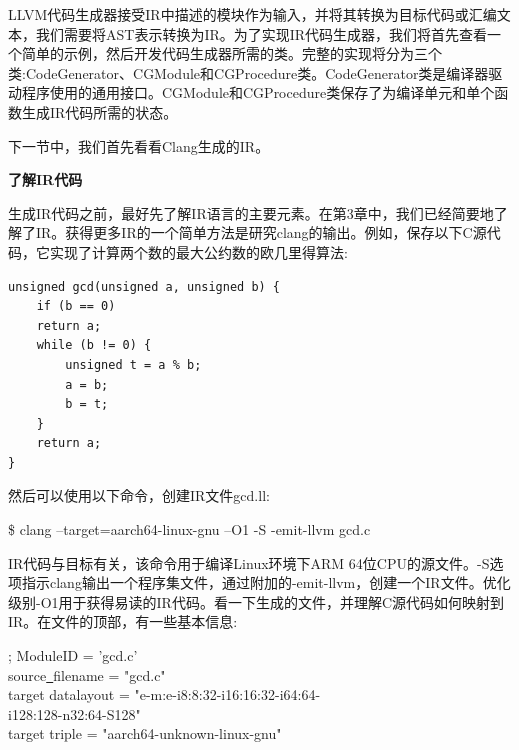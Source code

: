 LLVM代码生成器接受IR中描述的模块作为输入，并将其转换为目标代码或汇编文本，我们需要将AST表示转换为IR。为了实现IR代码生成器，我们将首先查看一个简单的示例，然后开发代码生成器所需的类。完整的实现将分为三个类:CodeGenerator、CGModule和CGProcedure类。CodeGenerator类是编译器驱动程序使用的通用接口。CGModule和CGProcedure类保存了为编译单元和单个函数生成IR代码所需的状态。\par

下一节中，我们首先看看Clang生成的IR。\par


\hspace*{\fill} \par %
\textbf{了解IR代码}

生成IR代码之前，最好先了解IR语言的主要元素。在第3章中，我们已经简要地了解了IR。获得更多IR的一个简单方法是研究clang的输出。例如，保存以下C源代码，它实现了计算两个数的最大公约数的欧几里得算法:\par

\begin{lstlisting}[caption={}]
unsigned gcd(unsigned a, unsigned b) {
	if (b == 0)
	return a;
	while (b != 0) {
		unsigned t = a % b;
		a = b;
		b = t;
	}
	return a;
}
\end{lstlisting}

然后可以使用以下命令，创建IR文件gcd.ll:\par

\begin{tcolorbox}[colback=white,colframe=black]
\$ clang --target=aarch64-linux-gnu –O1 -S -emit-llvm gcd.c
\end{tcolorbox}

IR代码与目标有关，该命令用于编译Linux环境下ARM 64位CPU的源文件。-S选项指示clang输出一个程序集文件，通过附加的-emit-llvm，创建一个IR文件。优化级别-O1用于获得易读的IR代码。看一下生成的文件，并理解C源代码如何映射到IR。在文件的顶部，有一些基本信息:\par

\begin{tcolorbox}[colback=white,colframe=black]
; ModuleID = 'gcd.c' \\
source\underline{~}filename = "gcd.c" \\
target datalayout = "e-m:e-i8:8:32-i16:16:32-i64:64- \\
\hspace*{3.5cm}i128:128-n32:64-S128" \\
target triple = "aarch64-unknown-linux-gnu"
\end{tcolorbox}

